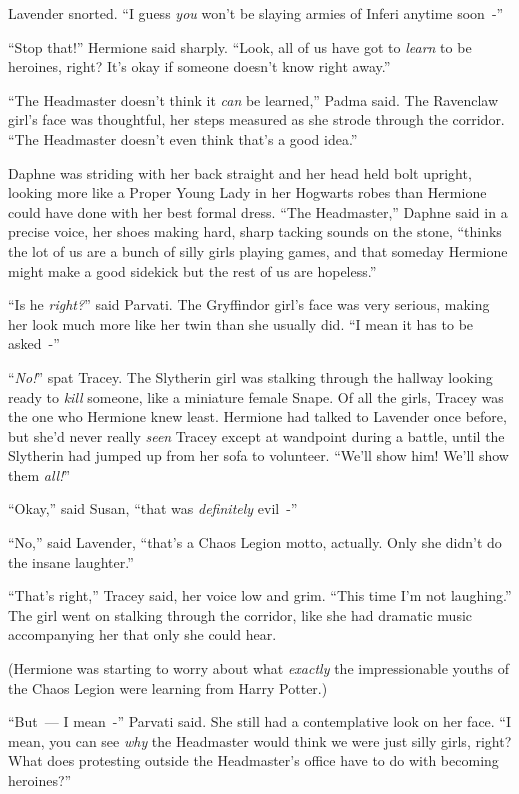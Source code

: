 Lavender snorted. ``I guess \emph{you} won't be slaying armies of Inferi anytime soon~-''

``Stop that!'' Hermione said sharply. ``Look, all of us have got to \emph{learn} to be heroines, right? It's okay if someone doesn't know right away.''

``The Headmaster doesn't think it \emph{can} be learned,'' Padma said. The Ravenclaw girl's face was thoughtful, her steps measured as she strode through the corridor. ``The Headmaster doesn't even think that's a good idea.''

Daphne was striding with her back straight and her head held bolt upright, looking more like a Proper Young Lady in her Hogwarts robes than Hermione could have done with her best formal dress. ``The Headmaster,'' Daphne said in a precise voice, her shoes making hard, sharp tacking sounds on the stone, ``thinks the lot of us are a bunch of silly girls playing games, and that someday Hermione might make a good sidekick but the rest of us are hopeless.''

``Is he \emph{right?}'' said Parvati. The Gryffindor girl's face was very serious, making her look much more like her twin than she usually did. ``I mean it has to be asked~-''

``\emph{No!}'' spat Tracey. The Slytherin girl was stalking through the hallway looking ready to \emph{kill} someone, like a miniature female Snape. Of all the girls, Tracey was the one who Hermione knew least. Hermione had talked to Lavender once before, but she'd never really \emph{seen} Tracey except at wandpoint during a battle, until the Slytherin had jumped up from her sofa to volunteer. ``We'll show him! We'll show them \emph{all!}''

``Okay,'' said Susan, ``that was \emph{definitely} evil~-''

``No,'' said Lavender, ``that's a Chaos Legion motto, actually. Only she didn't do the insane laughter.''

``That's right,'' Tracey said, her voice low and grim. ``This time I'm not laughing.'' The girl went on stalking through the corridor, like she had dramatic music accompanying her that only she could hear.

(Hermione was starting to worry about what \emph{exactly} the impressionable youths of the Chaos Legion were learning from Harry Potter.)

``But~--- I mean~-'' Parvati said. She still had a contemplative look on her face. ``I mean, you can see \emph{why} the Headmaster would think we were just silly girls, right? What does protesting outside the Headmaster's office have to do with becoming heroines?''

